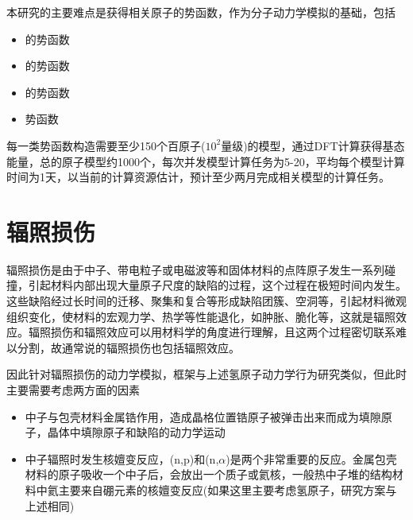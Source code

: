 本研究的主要难点是获得相关原子的势函数，作为分子动力学模拟的基础，包括
\begin{itemize}
	\item {}的势函数
	\item {}的势函数
	\item {}的势函数
	\item {}势函数
\end{itemize}
每一类势函数构造需要至少150个百原子($10^2$量级)的模型，通过\textrm{DFT}计算获得基态能量，总的原子模型约1000个，每次并发模型计算任务为5-20，平均每个模型计算时间为1天，以当前的计算资源估计，预计至少两月完成相关模型的计算任务。

\section{辐照损伤}
辐照损伤是由于中子、带电粒子或电磁波等和固体材料的点阵原子发生一系列碰撞，引起材料内部出现大量原子尺度的缺陷的过程，这个过程在极短时间内发生。这些缺陷经过长时间的迁移、聚集和复合等形成缺陷团簇、空洞等，引起材料微观组织变化，使材料的宏观力学、热学等性能退化，如肿胀、脆化等，这就是辐照效应。辐照损伤和辐照效应可以用材料学的角度进行理解，且这两个过程密切联系难以分割，故通常说的辐照损伤也包括辐照效应。

因此针对辐照损伤的动力学模拟，框架与上述氢原子动力学行为研究类似，但此时主要需要考虑两方面的因素
\begin{itemize}
	\item 中子与包壳材料金属锆作用，造成晶格位置锆原子被弹击出来而成为填隙原子，晶体中填隙原子和缺陷的动力学运动
	\item 中子辐照时发生核嬗变反应，\textrm{(n,p)}和\textrm{(n,$\alpha$)}是两个非常重要的反应。金属包壳材料的原子吸收一个中子后，会放出一个质子或氦核，一般热中子堆的结构材料中氦主要来自硼元素的核嬗变反应(如果这里主要考虑氢原子，研究方案与上述相同)
\end{itemize}
